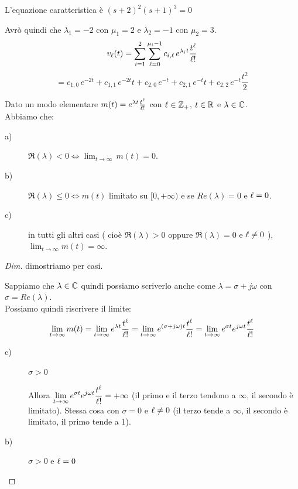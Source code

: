 	\begin{nexample}
	L'equazione caratteristica è $ (s+2)^2(s+1)^3=0 $
	
	Avrò quindi che $ \lambda_{1} = -2 $ con $ \mu_1=2 $ e $ \lambda_{2} = -1 $ con $ \mu_2=3 $.\\
	\[  v_\ell(t) =\sum_{i=1}^{2}\sum_{\ell=0}^{\mu_i-1}c_{i,\ell} \,e^{\lambda_it}\frac{t^\ell}{\ell!} \]
	 \[ = c_{1,0}\, e^{-2t} + c_{1,1}\, e^{-2t} t + c_{2,0}\, e^{-t} + c_{2,1}\, e^{-t} t + c_{2,2}\, e^{-t} \frac{t^2}{2} \]
	\end{nexample}


	\begin{theorem}
		Dato un modo elementare $m(t) = e^{\lambda t} \frac{t^\ell}{\ell!} $ con $ \ell \in \mathbb{Z}_+$, $ t \in \mathbb{R}$ e $ \lambda \in \mathbb{C} $.\\
		Abbiamo che:
		\begin{description}		
		\item[a)] $\Re( \lambda ) < 0 \Leftrightarrow  \lim_{t \to \infty} \, m(t) = 0 $.
		\item[b)] $\Re( \lambda ) \leq 0 \Leftrightarrow  m(t)$ limitato su $ [0, + \infty) $ e se $ Re( \lambda ) = 0 $ e $ \ell=0$.
		\item[c)] in tutti gli altri casi ( cioè $ \Re( \lambda ) > 0 $ oppure $ \Re( \lambda ) = 0 $ e $ \ell \neq 0$ ), $ \lim_{t \to \infty} m(t) = \infty $.
		\end{description}
	
		\begin{proof}[Dim]
		dimostriamo per casi.
		
		Sappiamo che $ \lambda \in \mathbb{C}$ quindi possiamo scriverlo anche come $ \lambda = \sigma + j \omega$ con $ \sigma = Re( \lambda)$.\\
		Possiamo quindi riscrivere il limite:
		 \[ \lim_{t \to \infty} m(t) = \lim_{t \to \infty} e^{\lambda t} \frac{t^\ell}{\ell!}= \lim_{t \to \infty} e^{(\sigma + j \omega ) t} \frac{t^\ell}{\ell!}= \lim_{t \to \infty} e^{\sigma t} e^{ j \omega t} \frac{t^\ell}{\ell!} \]
		\begin{description}	
		\item[c)] $ \sigma > 0$
		
		Allora $\displaystyle \lim_{t \to \infty} e^{\sigma t} e^{ j \omega t} \frac{t^\ell}{\ell!} = + \infty $ (il primo e il terzo tendono a $ \infty$, il secondo è limitato).
		Stessa cosa con $ \sigma = 0 $ e $ \ell \neq 0 $ (il terzo tende a $ \infty$, il secondo è limitato, il primo tende a 1).
		
		\item[b)] $ \sigma > 0$ e $ \ell =0$
		

\end{description}
\end{proof}
\end{theorem}
